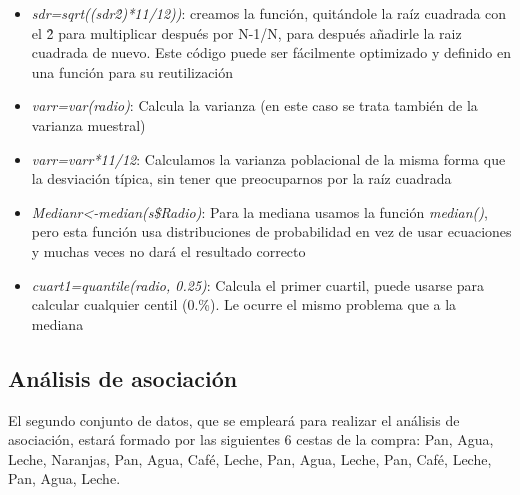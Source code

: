 \documentclass[a4paper, 12pt]{article}
\begin{document}
\begin{itemize}
            \item \emph{sdr=sqrt((sdr\^2)*11/12))}: creamos la función, quitándole la raíz cuadrada con el \^2 para multiplicar después por N-1/N, para después añadirle la raiz cuadrada de nuevo. Este código puede ser fácilmente optimizado y definido en una función para su reutilización
            
            \item \emph{varr=var(radio)}: Calcula la varianza (en este caso se trata también de la varianza muestral)
            
            \item \emph{varr=varr*11/12}: Calculamos la varianza poblacional de la misma forma que la desviación típica, sin tener que preocuparnos por la raíz cuadrada
        
            \item \emph{Medianr<-median(s\$Radio)}: Para la mediana usamos la función \emph{median()}, pero esta función usa distribuciones de probabilidad en vez de usar ecuaciones y muchas veces no dará el resultado correcto
        
            \item \emph{cuart1=quantile(radio, 0.25)}: Calcula el primer cuartil, puede usarse para calcular cualquier centil (0.\%). Le ocurre el mismo problema que a la mediana
        
        \end{itemize}
        
    
    \subsection{Análisis de asociación}
        El segundo conjunto de datos, que se empleará para realizar el análisis de asociación, estará formado por las siguientes 6 cestas de la compra: {Pan, Agua, Leche, Naranjas}, {Pan, Agua, Café, Leche}, {Pan, Agua, Leche}, {Pan, Café, Leche}, {Pan, Agua}, {Leche}.
\end{document}

